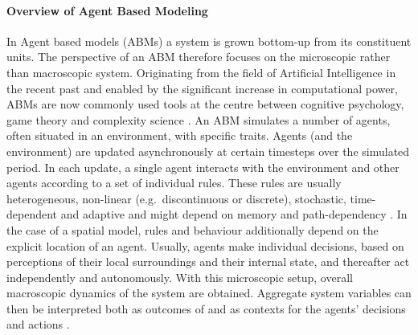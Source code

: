 \paragraph{Overview of Agent Based Modeling}
In Agent based models (ABMs) a system is grown bottom-up from its constituent units.
The perspective of an ABM therefore focuses on the microscopic rather than macroscopic system.
Originating from the field of Artificial Intelligence in the recent past and enabled by the significant increase in computational power, ABMs are now commonly used tools at the centre between cognitive psychology, game theory and complexity science \citep{Bousquet2004}.
An ABM simulates a number of agents, often situated in an environment, with specific traits.
Agents (and the environment) are updated asynchronously at certain timesteps over the simulated period.
In each update, a single agent interacts with the environment and other agents according to a set of individual rules.
These rules are usually heterogeneous, non-linear (e.g.\ discontinuous or discrete), stochastic, time-dependent and adaptive and might depend on memory and path-dependency \citep{Bonabeau2002}.
In the case of a spatial model, rules and behaviour additionally depend on the explicit location of an agent.
Usually, agents make individual decisions, based on perceptions of their local surroundings and their internal state, and thereafter act independently and autonomously.
With this microscopic setup, overall macroscopic dynamics of the system are obtained.
Aggregate system variables can then be interpreted both as outcomes of and as contexts for the agents' decisions and actions \citep{Kohler2000}.






